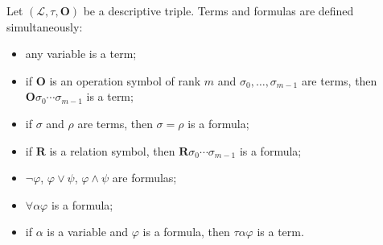 Let $(\mathcal{L}, \tau, \mathbf{O})$ be a descriptive triple. Terms and formulas are defined simultaneously:
\begin{itemize}
\item[(i)] any variable is a term;
\item[(ii)] if $\mathbf{O}$ is an operation symbol of rank $m$ and $\sigma_0, \ldots, \sigma_{m-1}$ are terms, then $\mathbf{O}\sigma_0\cdots\sigma_{m-1}$ is a term;
\item[(iii)] if $\sigma$ and $\rho$ are terms, then $\sigma = \rho$ is a formula;
\item[(iv)] if $\mathbf{R}$ is a relation symbol, then $\mathbf{R}\sigma_0\cdots\sigma_{m-1}$ is a formula;
\item[(v)] $\neg\varphi$, $\varphi \lor \psi$, $\varphi \land \psi$ are formulas;
\item[(vi)] $\forall\alpha\varphi$ is a formula;
\item[(vii)] if $\alpha$ is a variable and $\varphi$ is a formula, then $\tau\alpha\varphi$ is a term.
\end{itemize}
